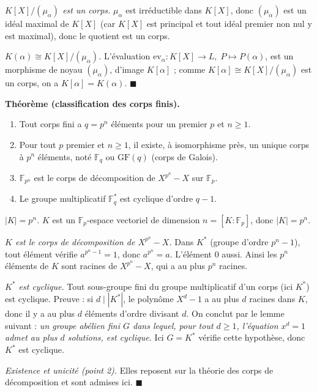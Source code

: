 \begin{mdframed}[style=proofbar]
  \textit{$K[X]/(\mu_\alpha)$ est un corps.}
  $\mu_\alpha$ est irréductible dans $K[X]$, donc $(\mu_\alpha)$ est un idéal maximal
  de $K[X]$ (car $K[X]$ est principal et tout idéal premier non nul y est maximal),
  donc le quotient est un corps.

  \textit{$K(\alpha) \cong K[X]/(\mu_\alpha)$.}
  L'évaluation $\mathrm{ev}_\alpha : K[X] \to L,\; P \mapsto P(\alpha)$,
  est un morphisme de noyau $(\mu_\alpha)$, d'image $K[\alpha]$ ; comme
  $K[\alpha] \cong K[X]/(\mu_\alpha)$ est un corps, on a $K[\alpha] = K(\alpha)$.
  \hfill$\blacksquare$
\end{mdframed}

\decsep{}


\begin{tcolorbox}[thmbox]
  \textbf{Théorème (classification des corps finis).}\enspace%
  \begin{enumerate}
    \item Tout corps fini a $q = p^n$ éléments pour un premier $p$ et $n \geq 1$.
    \item Pour tout $p$ premier et $n \geq 1$, il existe, à isomorphisme près,
          un unique corps à $p^n$ éléments, noté $\mathbb{F}_q$ ou
          $\mathrm{GF}(q)$ (corps de Galois).
    \item $\mathbb{F}_{p^n}$ est le corps de décomposition
          de $X^{p^n} - X$ sur $\mathbb{F}_p$.
    \item Le groupe multiplicatif $\mathbb{F}_q^*$ est cyclique d'ordre $q-1$.
  \end{enumerate}
\end{tcolorbox}

\begin{mdframed}[style=proofbar]
  \textit{$|K| = p^n$.}
  $K$ est un $\mathbb{F}_p$-espace vectoriel de dimension $n = [K:\mathbb{F}_p]$,
  donc $|K| = p^n$.

  \textit{$K$ est le corps de décomposition de $X^{p^n}-X$.}
  Dans $K^*$ (groupe d'ordre $p^n - 1$), tout élément vérifie $a^{p^n-1} = 1$,
  donc $a^{p^n} = a$. L'élément $0$ aussi. Ainsi les $p^n$ éléments de $K$ sont
  racines de $X^{p^n}-X$, qui a au plus $p^n$ racines.

  \textit{$K^*$ est cyclique.}
  Tout sous-groupe fini du groupe multiplicatif d'un corps (ici $K^*$) est cyclique.
  Preuve : si $d \mid |K^*|$, le polynôme $X^d - 1$ a au plus $d$ racines dans $K$,
  donc il y a au plus $d$ éléments d'ordre divisant $d$.
  On conclut par le lemme suivant : \emph{un groupe abélien fini $G$ dans lequel,
  pour tout $d \geq 1$, l'équation $x^d = 1$ admet au plus $d$ solutions, est
  cyclique.} Ici $G = K^*$ vérifie cette hypothèse, donc $K^*$ est cyclique.

  \textit{Existence et unicité (point 2).}
  Elles reposent sur la théorie des corps de décomposition et sont admises ici.
  \hfill$\blacksquare$
\end{mdframed}

